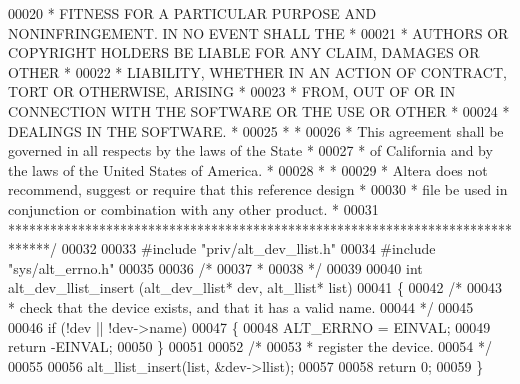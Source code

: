 \begin{DoxyCode}
00020 \textcolor{comment}{* FITNESS FOR A PARTICULAR PURPOSE AND NONINFRINGEMENT. IN NO EVENT SHALL THE *}
00021 \textcolor{comment}{* AUTHORS OR COPYRIGHT HOLDERS BE LIABLE FOR ANY CLAIM, DAMAGES OR OTHER      *}
00022 \textcolor{comment}{* LIABILITY, WHETHER IN AN ACTION OF CONTRACT, TORT OR OTHERWISE, ARISING     *}
00023 \textcolor{comment}{* FROM, OUT OF OR IN CONNECTION WITH THE SOFTWARE OR THE USE OR OTHER         *}
00024 \textcolor{comment}{* DEALINGS IN THE SOFTWARE.                                                   *}
00025 \textcolor{comment}{*                                                                             *}
00026 \textcolor{comment}{* This agreement shall be governed in all respects by the laws of the State   *}
00027 \textcolor{comment}{* of California and by the laws of the United States of America.              *}
00028 \textcolor{comment}{*                                                                             *}
00029 \textcolor{comment}{* Altera does not recommend, suggest or require that this reference design    *}
00030 \textcolor{comment}{* file be used in conjunction or combination with any other product.          *}
00031 \textcolor{comment}{******************************************************************************/}
00032 
00033 \textcolor{preprocessor}{#include "priv/alt_dev_llist.h"}
00034 \textcolor{preprocessor}{#include "sys/alt_errno.h"}
00035 
00036 \textcolor{comment}{/*}
00037 \textcolor{comment}{ *}
00038 \textcolor{comment}{ */}
00039 
00040 \textcolor{keywordtype}{int} alt_dev_llist_insert (alt_dev_llist* dev, alt_llist* list)
00041 \{
00042   \textcolor{comment}{/*}
00043 \textcolor{comment}{   * check that the device exists, and that it has a valid name.}
00044 \textcolor{comment}{   */}
00045 
00046   \textcolor{keywordflow}{if} (!dev || !dev->name)
00047   \{
00048     ALT_ERRNO = EINVAL;
00049     \textcolor{keywordflow}{return} -EINVAL;
00050   \}
00051   
00052   \textcolor{comment}{/*}
00053 \textcolor{comment}{   * register the device.}
00054 \textcolor{comment}{   */}
00055   
00056   alt_llist_insert(list, &dev->llist);
00057 
00058   \textcolor{keywordflow}{return} 0;  
00059 \}
\end{DoxyCode}
